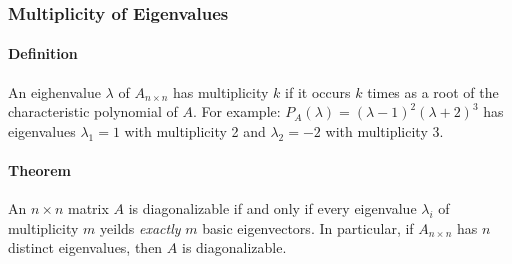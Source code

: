 \subsubsection*{Multiplicity of Eigenvalues}
\paragraph*{Definition}
An eighenvalue $\lambda$ of $A_{n \times n}$ has multiplicity $k$ if it occurs $k$ times as a root of the characteristic polynomial of $A$.
For example: $P_A(\lambda) = (\lambda - 1)^2(\lambda + 2)^3$ has eigenvalues $\lambda_1 = 1$ with multiplicity 2 and $\lambda_2 = -2$ with multiplicity 3.

\paragraph*{Theorem}
An $n \times n$ matrix $A$ is diagonalizable if and only if every eigenvalue $\lambda_i$ of multiplicity $m$ yeilds \emph{exactly} $m$ basic eigenvectors.
In particular, if $A_{n \times n}$ has $n$ distinct eigenvalues, then $A$ is diagonalizable.